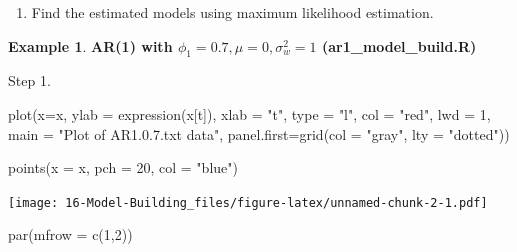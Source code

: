 \documentclass[
]{book}
\newenvironment{Shaded}{\begin{snugshade}}{\end{snugshade}}
\newcommand{\AttributeTok}[1]{\textcolor[rgb]{0.77,0.63,0.00}{#1}}
\newcommand{\ConstantTok}[1]{\textcolor[rgb]{0.00,0.00,0.00}{#1}}
\newcommand{\DecValTok}[1]{\textcolor[rgb]{0.00,0.00,0.81}{#1}}
\newcommand{\FunctionTok}[1]{\textcolor[rgb]{0.00,0.00,0.00}{#1}}
\newcommand{\NormalTok}[1]{#1}
\newcommand{\OtherTok}[1]{\textcolor[rgb]{0.56,0.35,0.01}{#1}}
\newcommand{\SpecialCharTok}[1]{\textcolor[rgb]{0.00,0.00,0.00}{#1}}
\newcommand{\StringTok}[1]{\textcolor[rgb]{0.31,0.60,0.02}{#1}}
\providecommand{\tightlist}{%
  \setlength{\itemsep}{0pt}\setlength{\parskip}{0pt}}
\theoremstyle{definition}
\theoremstyle{definition}
\newtheorem{example}{Example}[chapter]
\theoremstyle{definition}
\theoremstyle{definition}
\theoremstyle{remark}
\begin{document}
\begin{enumerate}
\def\labelenumi{\arabic{enumi}.}
\setcounter{enumi}{2}
\tightlist
\item
  Find the estimated models using maximum likelihood estimation.
\end{enumerate}

\begin{example}

\textbf{AR(1) with \(\phi_1=0.7, \mu=0, \sigma_w^2=1\) (ar1\_model\_build.R)}

Step 1.

\begin{Shaded}
\end{Shaded}

\begin{Shaded}
\begin{Highlighting}[]
\FunctionTok{plot}\NormalTok{(}\AttributeTok{x=}\NormalTok{x, }\AttributeTok{ylab =} \FunctionTok{expression}\NormalTok{(x[t]), }\AttributeTok{xlab =} \StringTok{"t"}\NormalTok{, }\AttributeTok{type =} 
    \StringTok{"l"}\NormalTok{, }\AttributeTok{col =} \StringTok{"red"}\NormalTok{, }\AttributeTok{lwd =} \DecValTok{1}\NormalTok{, }\AttributeTok{main =} \StringTok{"Plot of }
\StringTok{     AR1.0.7.txt data"}\NormalTok{, }\AttributeTok{panel.first=}\FunctionTok{grid}\NormalTok{(}\AttributeTok{col =} \StringTok{"gray"}\NormalTok{, }
     \AttributeTok{lty =} \StringTok{"dotted"}\NormalTok{))}

\FunctionTok{points}\NormalTok{(}\AttributeTok{x =}\NormalTok{ x, }\AttributeTok{pch =} \DecValTok{20}\NormalTok{, }\AttributeTok{col =} \StringTok{"blue"}\NormalTok{) }
\end{Highlighting}
\end{Shaded}

\texttt{[image: 16-Model-Building\_files/figure-latex/unnamed-chunk-2-1.pdf]}

\begin{Shaded}
\begin{Highlighting}[]
\FunctionTok{par}\NormalTok{(}\AttributeTok{mfrow =} \FunctionTok{c}\NormalTok{(}\DecValTok{1}\NormalTok{,}\DecValTok{2}\NormalTok{))}


\end{Highlighting}
\end{Shaded}
\end{example}
\end{document}
